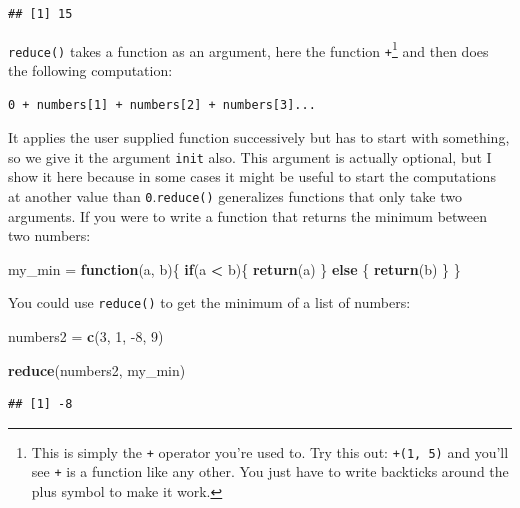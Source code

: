 \documentclass[]{gitbook}
\newenvironment{Shaded}{\begin{snugshade}}{\end{snugshade}}
\newcommand{\ControlFlowTok}[1]{\textcolor[rgb]{0.13,0.29,0.53}{\textbf{#1}}}
\newcommand{\DecValTok}[1]{\textcolor[rgb]{0.00,0.00,0.81}{#1}}
\newcommand{\KeywordTok}[1]{\textcolor[rgb]{0.13,0.29,0.53}{\textbf{#1}}}
\newcommand{\NormalTok}[1]{#1}
\newcommand{\OperatorTok}[1]{\textcolor[rgb]{0.81,0.36,0.00}{\textbf{#1}}}
\newcommand{\StringTok}[1]{\textcolor[rgb]{0.31,0.60,0.02}{#1}}
\let\rmarkdownfootnote\footnote%
\def\footnote{\protect\rmarkdownfootnote}
\theoremstyle{definition}
\theoremstyle{definition}
\theoremstyle{definition}
\theoremstyle{remark}
\begin{document}
\begin{verbatim}
## [1] 15
\end{verbatim}

\texttt{reduce()} takes a function as an argument, here the function
\texttt{+}\footnote{This is simply the \texttt{+} operator you're used
  to. Try this out: \texttt{\textasciigrave{}+\textasciigrave{}(1,\ 5)}
  and you'll see \texttt{+} is a function like any other. You just have
  to write backticks around the plus symbol to make it work.} and then
does the following computation:

\begin{verbatim}
0 + numbers[1] + numbers[2] + numbers[3]...
\end{verbatim}

It applies the user supplied function successively but has to start with
something, so we give it the argument \texttt{init} also. This argument
is actually optional, but I show it here because in some cases it might
be useful to start the computations at another value than
\texttt{0}.\texttt{reduce()} generalizes functions that only take two
arguments. If you were to write a function that returns the minimum
between two numbers:

\begin{Shaded}
\begin{Highlighting}[]
\NormalTok{my_min =}\StringTok{ }\ControlFlowTok{function}\NormalTok{(a, b)\{}
    \ControlFlowTok{if}\NormalTok{(a }\OperatorTok{<}\StringTok{ }\NormalTok{b)\{}
        \KeywordTok{return}\NormalTok{(a)}
\NormalTok{    \} }\ControlFlowTok{else}\NormalTok{ \{}
        \KeywordTok{return}\NormalTok{(b)}
\NormalTok{    \}}
\NormalTok{\}}
\end{Highlighting}
\end{Shaded}

You could use \texttt{reduce()} to get the minimum of a list of numbers:

\begin{Shaded}
\begin{Highlighting}[]
\NormalTok{numbers2 =}\StringTok{ }\KeywordTok{c}\NormalTok{(}\DecValTok{3}\NormalTok{, }\DecValTok{1}\NormalTok{, }\DecValTok{-8}\NormalTok{, }\DecValTok{9}\NormalTok{)}

\KeywordTok{reduce}\NormalTok{(numbers2, my_min)}
\end{Highlighting}
\end{Shaded}

\begin{verbatim}
## [1] -8
\end{verbatim}
\end{document}
